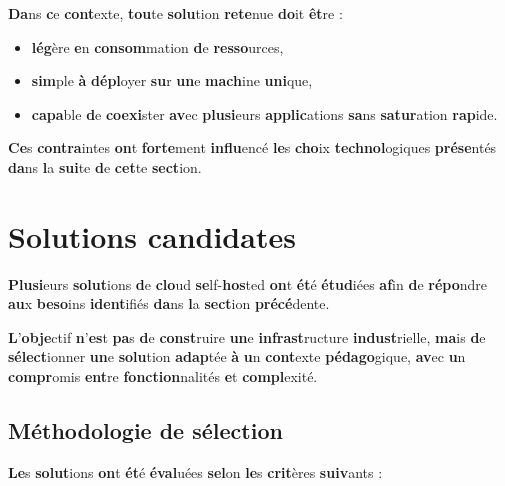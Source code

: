 \documentclass{rapportClass} %
\begin{document}
\textbf{Da}ns \textbf{c}e \textbf{cont}exte, \textbf{tou}te \textbf{solu}tion \textbf{rete}nue \textbf{do}it \textbf{êt}re :
\begin{itemize}
\item \textbf{lég}ère \textbf{e}n \textbf{consom}mation \textbf{d}e \textbf{resso}urces,
\item \textbf{sim}ple \textbf{à} \textbf{dépl}oyer \textbf{su}r \textbf{un}e \textbf{mach}ine \textbf{uni}que,
\item \textbf{capa}ble \textbf{d}e \textbf{coexi}ster \textbf{av}ec \textbf{plusi}eurs \textbf{applic}ations \textbf{sa}ns \textbf{satur}ation \textbf{rap}ide.
\end{itemize}

\textbf{Ce}s \textbf{contra}intes \textbf{on}t \textbf{forte}ment \textbf{influ}encé \textbf{le}s \textbf{cho}ix \textbf{technol}ogiques
\textbf{prése}ntés \textbf{da}ns \textbf{l}a \textbf{sui}te \textbf{d}e \textbf{cet}te \textbf{sect}ion.

\section{Solutions candidates}

\textbf{Plusi}eurs \textbf{solut}ions \textbf{d}e \textbf{clo}ud \textbf{se}lf-\textbf{hos}ted \textbf{on}t \textbf{ét}é \textbf{étud}iées \textbf{af}in \textbf{d}e
\textbf{répo}ndre \textbf{au}x \textbf{beso}ins \textbf{ident}ifiés \textbf{da}ns \textbf{l}a \textbf{sect}ion \textbf{précé}dente.

\textbf{L}’\textbf{obje}ctif \textbf{n}’\textbf{es}t \textbf{pa}s \textbf{d}e \textbf{const}ruire \textbf{un}e \textbf{infrast}ructure \textbf{indust}rielle,
\textbf{ma}is \textbf{d}e \textbf{sélect}ionner \textbf{un}e \textbf{solu}tion \textbf{adap}tée \textbf{à} \textbf{u}n \textbf{cont}exte \textbf{pédago}gique,
\textbf{av}ec \textbf{u}n \textbf{compr}omis \textbf{ent}re \textbf{fonction}nalités \textbf{e}t \textbf{compl}exité.

\subsection{Méthodologie de sélection}

\textbf{Le}s \textbf{solut}ions \textbf{on}t \textbf{ét}é \textbf{éval}uées \textbf{sel}on \textbf{le}s \textbf{crit}ères \textbf{suiv}ants :
\end{document}
